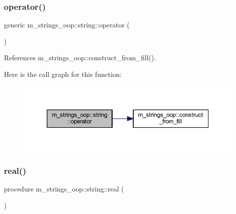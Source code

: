 \mbox{\label{structm__strings__oop_1_1string_a079d7dd91faba60518e61f0634df7a6f}} 
\subsubsection{\texorpdfstring{operator()}{operator()}\hspace{0.1cm}{\footnotesize\ttfamily [10/10]}}
{\footnotesize\ttfamily generic m\+\_\+strings\+\_\+oop\+::string\+::operator (\begin{DoxyParamCaption}{ }\end{DoxyParamCaption})\hspace{0.3cm}{\ttfamily [private]}}



References m\+\_\+strings\+\_\+oop\+::construct\+\_\+from\+\_\+fill().

Here is the call graph for this function\+:
\nopagebreak
\begin{figure}[H]
\begin{center}
\leavevmode
\includegraphics[width=350pt]{structm__strings__oop_1_1string_a079d7dd91faba60518e61f0634df7a6f_cgraph}
\end{center}
\end{figure}
\mbox{\label{structm__strings__oop_1_1string_ad1eb39ed0e02c1180c933b506d7eaa6a}} 
\subsubsection{\texorpdfstring{real()}{real()}}
{\footnotesize\ttfamily procedure m\+\_\+strings\+\_\+oop\+::string\+::real (\begin{DoxyParamCaption}{ }\end{DoxyParamCaption})\hspace{0.3cm}{\ttfamily [private]}}

